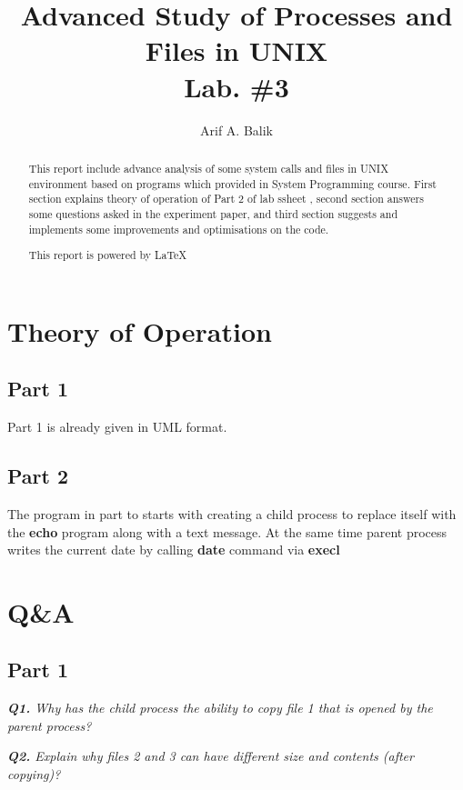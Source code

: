 \documentclass[11pt]{article}
\title{Advanced Study of Processes and Files in UNIX \\Lab. \#3}
\author{Arif A. Balik}
\affil{Undergraduate Student\\
	Sytstems Programming\\
	Department of Computer Science\\
	Arel University\\
	Büyükçekmece, İstanbul 34537\\
    Email: arifbalik@outlook.com
}
\begin{document}
\maketitle

\begin{abstract}
This report include advance analysis of some system calls and files in UNIX environment based on programs which provided in System Programming course. First section explains theory of operation of Part 2 of lab ssheet , second section answers some questions asked in the experiment paper, and third section suggests and implements some improvements and optimisations on the code.

This report is powered by \LaTeX{}
\end{abstract}

\section*{Theory of Operation}
\subsection*{Part 1}

Part 1 is already given in UML format.
\subsection*{Part 2}

The program in part to starts with creating a child process to replace itself with the \textbf{echo} program along with a text message. At the same time parent process writes the current date by calling \textbf{date} command via \textbf{execl}
\section*{Q\&A}



\subsection*{Part 1}

\vspace{3mm}
\textit{\textbf{Q1.} Why has the child process the ability to copy file 1 that is opened by the parent process?}
\vspace{3mm}


\vspace{3mm}
\textit{\textbf{Q2.} Explain why files 2 and 3 can have different size and contents (after copying)?}
\vspace{3mm}
\end{document}
